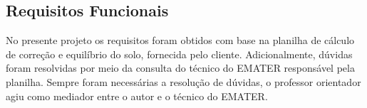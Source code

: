 \subsection{Requisitos Funcionais}
\label{sec:titSecReqFunc}



No presente projeto os requisitos foram obtidos com base na planilha de cálculo de correção e equilíbrio do solo, fornecida pelo cliente. Adicionalmente, dúvidas foram resolvidas por meio da consulta do técnico do EMATER responsável pela planilha. Sempre foram necessárias a resolução de dúvidas, o professor orientador agiu como mediador entre o autor e o técnico do EMATER.

